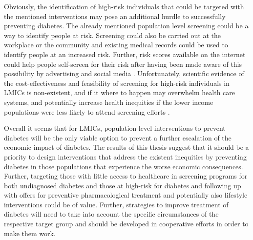 Obviously, the identification of high-risk individuals that could be targeted with the mentioned interventions may pose an additional hurdle to successfully preventing diabetes. The already mentioned population level screening could be a way to identify people at risk. Screening could also be carried out at the workplace or the community and existing medical records could be used to identify people at an increased risk. Further, risk scores available on the internet could help people self-screen for their risk after having been made aware of this possibility by advertising and social media \parencite{Cefalu2016}. Unfortunately, scientific evidence of the cost-effectiveness and feasibility of screening for high-risk individuals in \acp{LMIC} is non-existent, and if it where to happen may overwhelm health care systems, and potentially increase health inequities if the lower income populations were less likely to attend screening efforts \parencite{Wareham2016}.

Overall it seems that for \acp{LMIC}, population level interventions to prevent diabetes will be the only viable option to prevent a further escalation of the economic impact of diabetes. The results of this thesis suggest that it should be a priority to design interventions that address the existent inequities by preventing diabetes in those populations that experience the worse economic consequences. Further, targeting those with little access to healthcare in screening programs for both undiagnosed diabetes and those at high-risk for diabetes and following up with offers for preventive pharmacological treatment and potentially also lifestyle interventions could be of value. Further, strategies to improve treatment of diabetes will need to take into account the specific circumstances of the respective target group and should be developed in cooperative efforts in order to make them work.

